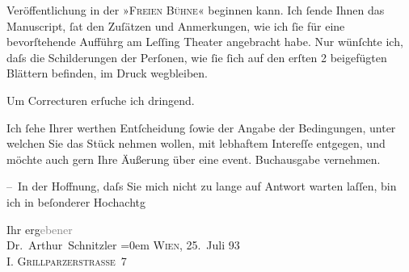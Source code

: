                Veröffentlichung in der »\textsc{Freien Bühne}« {\pb}beginnen kann. Ich{ }ſende Ihnen das Manuscript,{ }ſa{\geminationm}t den Zuſätzen und Anmerkungen, wie ich{ }ſie für eine bevorſtehende Aufführg am Leſſing Theater angebracht habe. Nur wünſchte ich,
               daſs die Schilderungen der Perſonen, wie{ }ſie{ }ſich auf den erſten 2 beigefügten
               Blättern befinden, im Druck wegbleiben.\pend
           
\pstart
           {\pb}Um Correcturen erſuche ich dringend.\pend
           
\pstart
           Ich{ }ſehe Ihrer werthen Entſcheidung{ }ſowie der Angabe der Bedingungen, unter welchen
               Sie das Stück nehmen wollen, mit lebhaftem
               Intereſſe entgegen, und möchte auch gern Ihre Äußerung über eine event. Buchausgabe
               vernehmen.\pend
           
\pstart
           – In der Hoffnung, daſs {\pb}Sie mich nicht zu lange auf Antwort
               warten laſſen, bin ich in beſonderer Hochachtg\pend
           
\pstart
           Ihr erg\textcolor{gray}{ebener}{\\[\baselineskip]}\spacefill\mbox{Dr. Arthur Schnitzler}\pend
           \leftskip=0em{}
\pstart
           \textsc{Wien}, 25. Juli 93{\\}\textsc{I. Grillparzerstraße 7}\pend
           \endnumbering{}  \newcommand{\dateiname}{L00242}\newcommand{\titel}{Arthur Schnitzler an Samuel Fischer, 25. 7. 1893}\newcommand{\editorInnen}{Martin Anton Müller und Gerd-Hermann Susen}

